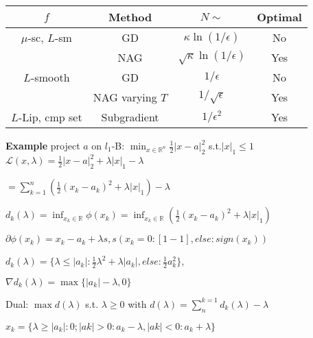 \begin{tabular}{|c|c|c|c|}
	\hline
	$f$              & Method          & $N \sim$                         & Optimal \\ \hline
	$\mu$-sc, $L$-sm & GD              & $\kappa \ln (1/\epsilon)$        & No      \\
	                 & NAG             & $\sqrt{\kappa} \ln (1/\epsilon)$ & Yes     \\ \hline
	$L$-smooth       & GD              & $1/\epsilon$                     & No      \\
	                 & NAG varying $T$ & $1/\sqrt{\epsilon}$              & Yes     \\ \hline
	$L$-Lip, cmp set & Subgradient     & $1/\epsilon^2$                   & Yes     \\ \hline
\end{tabular}

\textbf{Example}
project $a$  on $l_1$-B:
$\min_{x \in \mathbb{R}^{n}}\frac{1}{2}|x-a|_2^2$ s.t.$|x|_1\le 1$
$\mathcal{L}(x,\lambda)=\frac{1}{2}|x-a|_2^2 +\lambda|x|_1-\lambda$

$=\sum_{k=1}^{n}(\frac{1}{2}(x_k-a_k)^2+\lambda|x|_1)-\lambda$

$d_k(\lambda)=\inf_{x_k\in\mathbb{R}}\phi(x_k)
	=\inf_{x_k\in\mathbb{R}}
	(\frac{1}{2}(x_k-a_k)^2+\lambda|x|_1)$

$\partial\phi(x_k)=x_k-a_k+\lambda s,
	s(x_k=0:[1-1],else: sign(x_k))$

$d_k(\lambda) = \{\lambda\le|a_k|:\frac{1}{2}\lambda^2+\lambda|a_k|,
	else: \frac{1}{2}a_k^2\}$,

$\nabla d_k(\lambda) = \max\{|a_k|-\lambda,0\}$

Dual: $\max d(\lambda)$ s.t. $\lambda\ge0$
with
$d(\lambda)=\sum_{n}^{k=1}d_k(\lambda)-\lambda$

$x_k=\{\lambda\ge|a_k|:0;|ak|>0:a_k-\lambda, |ak|<0:a_k+\lambda\}$

\vspace{1mm}
